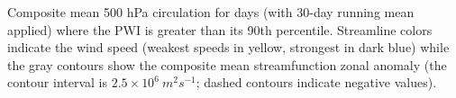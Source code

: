 \label{fig:pwi_spatial_summary}
Composite mean 500 hPa circulation for days (with 30-day running mean applied) where the PWI is greater than its 90th percentile. Streamline colors indicate the wind speed (weakest speeds in yellow, strongest in dark blue) while the gray contours show the composite mean streamfunction zonal anomaly (the contour interval is $2.5 \times 10^6 \: m^2 s^{-1}$; dashed contours indicate negative values). 